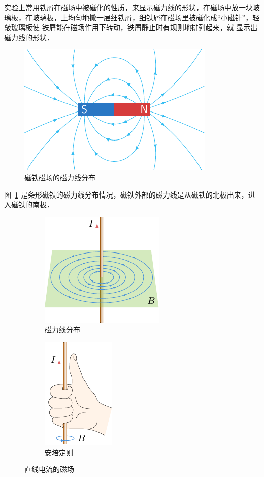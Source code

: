 实验上常用铁屑在磁场中被磁化的性质，来显示磁力线的形状，在磁场中放一块玻璃板，在玻璃板，上均匀地撒一层细铁屑，细铁屑在磁场里被磁化成“小磁针”，轻敲玻璃板使
铁屑能在磁场作用下转动，铁屑静止时有规则地排列起来，就
显示出磁力线的形状．

\begin{figure}[htbp]
    \centering
    \includegraphics{fig/C/1-5.pdf}
    \caption{磁铁磁场的磁力线分布}\label{fig_C_1-5}
\end{figure}

图~\ref{fig_C_1-5} 是条形磁铁的磁力线分布情况，磁铁外部的磁力线是从磁铁的北极出来，进入磁铁的南极．

\begin{figure}[htbp]
    \centering
    \begin{subfigure}{0.4\linewidth}
        \centering
        \includegraphics{fig/C/1-6a.pdf}
        \caption{磁力线分布}\label{fig_C_1-6a}
    \end{subfigure}
    \hfil
    \begin{subfigure}{0.4\linewidth}
        \centering
        \includegraphics{fig/C/1-6b.pdf}
        \caption{安培定则}\label{fig_C_1-6b}
    \end{subfigure}
    \caption{直线电流的磁场}\label{fig_C_1-6}
\end{figure}


